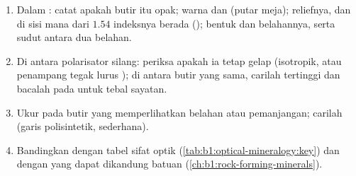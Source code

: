 \begin{method}\label{met:b1:optical-mineralogy:identify}
\begin{enumerate}
  \item Dalam : catat apakah butir itu opak; warna dan  (putar meja); reliefnya, dan di sisi mana dari $1.54$ indeksnya berada (); bentuk dan belahannya, serta sudut antara dua belahan.
  \item Di antara polarisator silang: periksa apakah ia tetap gelap (isotropik, atau penampang tegak lurus ); di antara butir  yang sama, carilah  tertinggi dan bacalah  pada  untuk tebal sayatan.
  \item Ukur  pada butir yang memperlihatkan belahan atau pemanjangan; carilah  (garis polisintetik,  sederhana).
  \item Bandingkan dengan tabel sifat optik (\cref{tab:b1:optical-mineralogy:key}) dan dengan  yang dapat dikandung batuan (\cref{ch:b1:rock-forming-minerals}).
\end{enumerate}
\end{method}

